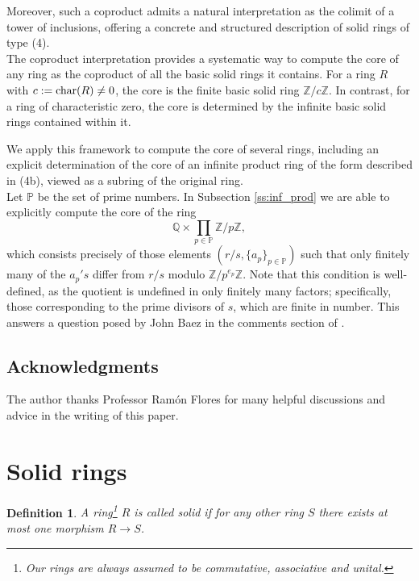 \documentclass{amsart}
\newtheorem{definition}[subsection]{Definition}
\newcommand{\chara}{{\textup{char}}}
\newcommand{\Z}{{\mathbb Z}}
\renewcommand{\P}{{\mathbb P}}
\newcommand{\Q}{{\mathbb Q}}
\begin{document}
    Moreover, such a coproduct admits a natural interpretation as the colimit of a tower of inclusions, offering a concrete and structured description of solid rings of type (4).\\

    The coproduct interpretation provides a systematic way to compute the core of any ring as the coproduct of all the basic solid rings it contains.
    For a ring $R$ with $c:=\chara(R) \not= 0$, the core is the finite basic solid ring $\Z/c\Z$.
    In contrast, for a ring of characteristic zero, the core is determined by the infinite basic solid rings contained within it.

    We apply this framework to compute the core of several rings, including an explicit determination of the core of an infinite product ring of the form described in (4b), viewed as a subring of the original ring.\\

    Let $\P$ be the set of prime numbers.
    In Subsection \ref{ss:inf_prod} we are able to explicitly compute the core of the ring
    $$
    \Q\times \prod\limits_{p \in \P} \Z/p\Z,
    $$
    which consists precisely of those elements $(r/s, \{a_p\}_{p \in \P})$ such that only finitely many of the ${a_p}'s$ differ from $r/s$ modulo $\Z/p^{e_{p}}\Z$.
    Note that this condition is well-defined, as the quotient is undefined in only finitely many factors; specifically, those corresponding to the prime divisors of $s$, which are finite in number.
    This answers a question posed by John Baez in the comments section of \cite{Bae21}.

    \subsection{Acknowledgments}
    The author thanks Professor Ramón Flores for many helpful discussions and advice in the writing of this paper.
	
	\section{Solid rings}
	\noindent

    \begin{definition}
		A ring\footnote{Our rings are always assumed to be commutative, associative and unital.} $R$ is called \emph{solid} if for any other ring $S$ there exists at most one morphism $R \to S$.
    \end{definition}
\end{document}
